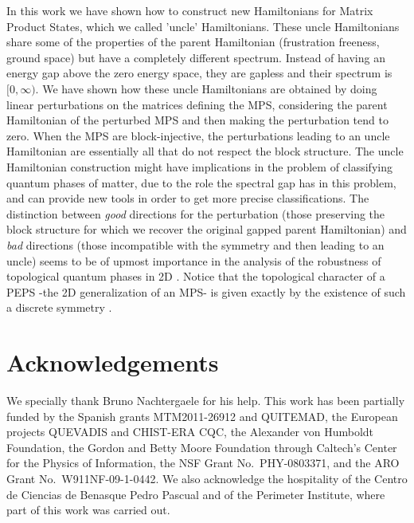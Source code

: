 \documentclass[cmp]{svjour}
\begin{document}
In this work we have shown how to construct new Hamiltonians for Matrix Product States, which we called 'uncle' Hamiltonians. These uncle Hamiltonians  share some of the properties of the parent Hamiltonian (frustration freeness, ground space) but have a completely different spectrum. Instead of having an energy gap above the zero energy space, they are gapless and their spectrum is $[0,\infty)$. We have shown how these uncle Hamiltonians are obtained by doing  linear perturbations on the matrices defining the MPS, considering the parent Hamiltonian of the perturbed MPS and then making the perturbation tend to zero. When the MPS are block-injective, the perturbations leading to an uncle Hamiltonian are essentially all that do not respect the block structure. The uncle Hamiltonian construction might have implications in the problem of classifying quantum phases of matter, due to the role the spectral gap has in this problem, and can provide new tools in order to get more precise classifications. The distinction between {\it good} directions for the perturbation (those preserving the block structure for which we recover the original gapped parent Hamiltonian) and {\it bad} directions (those incompatible with the symmetry and then leading to an uncle) seems to be of upmost importance in the analysis of the robustness of topological quantum phases in 2D \cite{fernandez:toric-code,robustness-2D}. Notice that the topological character of a PEPS -the 2D generalization of an MPS- is given exactly by the existence of such a discrete symmetry \cite{schuch:peps-sym}.


\section*{Acknowledgements}
We specially thank Bruno Nachtergaele for his help.  This work has been
partially funded by the Spanish grants MTM2011-26912
and QUITEMAD, the European projects QUEVADIS and CHIST-ERA CQC, the Alexander
von Humboldt Foundation, the Gordon and Betty Moore Foundation through
Caltech's Center for the Physics of Information, the NSF Grant No.\
PHY-0803371, and the ARO Grant No.\ W911NF-09-1-0442.  We also acknowledge
the hospitality of the Centro de Ciencias de Benasque Pedro Pascual and of
the Perimeter Institute, where part of this work was carried out.
\end{document}
